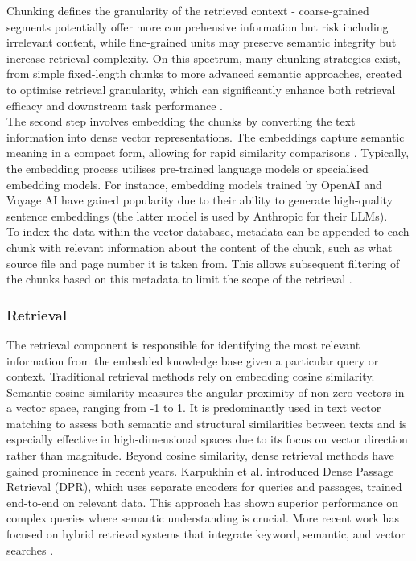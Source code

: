 Chunking defines the granularity of the retrieved context - coarse-grained segments potentially offer more comprehensive information but risk including irrelevant content, while fine-grained units may preserve semantic integrity but increase retrieval complexity. On this spectrum, many chunking strategies exist, from simple fixed-length chunks to more advanced semantic approaches, created to optimise retrieval granularity, which can significantly enhance both retrieval efficacy and downstream task performance \cite{gao2024retrievalaugmented}.\\

The second step involves embedding the chunks by converting the text information into dense vector representations. The embeddings capture semantic meaning in a compact form, allowing for rapid similarity comparisons \cite{gao2024retrievalaugmented}. Typically, the embedding process utilises pre-trained language models or specialised embedding models. For instance, embedding models trained by OpenAI \cite{openaiembeddingmodel} and Voyage AI \cite{voyageembeddingmodel} have gained popularity due to their ability to generate high-quality sentence embeddings (the latter model is used by Anthropic for their LLMs). \\

To index the data within the vector database, metadata can be appended to each chunk with relevant information about the content of the chunk, such as what source file and page number it is taken from. This allows subsequent filtering of the chunks based on this metadata to limit the scope of the retrieval \cite{gao2024retrievalaugmented}.

\subsubsection{Retrieval}

The retrieval component is responsible for identifying the most relevant information from the embedded knowledge base given a particular query or context. Traditional retrieval methods rely on embedding cosine similarity. Semantic cosine similarity \cite{rahutomo2012semantic} measures the angular proximity of non-zero vectors in a vector space, ranging from -1 to 1. It is predominantly used in text vector matching to assess both semantic and structural similarities between texts and is especially effective in high-dimensional spaces due to its focus on vector direction rather than magnitude. Beyond cosine similarity, dense retrieval methods have gained prominence in recent years. Karpukhin et al. \cite{karpukhin2020dense} introduced Dense Passage Retrieval (DPR), which uses separate encoders for queries and passages, trained end-to-end on relevant data. This approach has shown superior performance on complex queries where semantic understanding is crucial. More recent work has focused on hybrid retrieval systems that integrate keyword, semantic, and
vector searches \cite{gao2024retrievalaugmented}. \\

